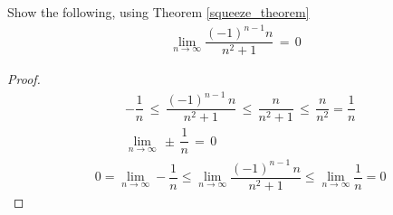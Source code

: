 \begin{exercise}
Show the following, using Theorem \ref{squeeze_theorem}
\begin{align*}
    \lim_{n \longrightarrow \infty} \dfrac{(-1)^{n-1}n}{n^{2}+1} \hspace{2pt} = \hspace{2pt} 0
\end{align*}
\begin{proof}
    \begin{align*}
        &-\dfrac{1}{n} \hspace{2pt} \leq \hspace{2pt} \dfrac{(-1)^{n-1} \hspace{2pt} n}{n^{2} + 1} \hspace{2pt} \leq \hspace{2pt} \dfrac{n}{n^{2} + 1} \hspace{2pt} \leq \hspace{2pt} \dfrac{n}{n^{2}} = \dfrac{1}{n}\\[2ex]
        &\lim_{n \longrightarrow \infty} \hspace{2pt} \pm \hspace{2pt} \dfrac{1}{n} \hspace{2pt} = \hspace{2pt} 0
    \end{align*}
    \begin{align*}
        &0 = \lim_{n \longrightarrow \infty} -\dfrac{1}{n} \leq \lim_{n \longrightarrow \infty} \dfrac{(-1)^{n-1} \hspace{2pt} n}{n^{2} + 1} \leq \lim_{n \longrightarrow \infty} \dfrac{1}{n} = 0
    \end{align*}
\end{proof}
\end{exercise}

